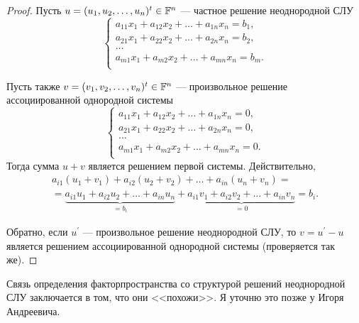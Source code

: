 \begin{proof}
    Пусть $u = (u_1, u_2, \ldots, u_n)^t \in \mathbb{F}^n$ --- частное решение неоднородной СЛУ
    \[
        \begin{cases}
            a_{11}x_1 + a_{12}x_2 + \ldots + a_{1n}x_n = b_1,\\
            a_{21}x_1 + a_{22}x_2 + \ldots + a_{2n}x_n = b_2,\\
            \ldots\\
            a_{m1}x_1 + a_{m2}x_2 + \ldots + a_{mn}x_n = b_m.\\
        \end{cases}
    \]

    Пусть также $v = (v_1, v_2, \ldots, v_n)^t \in \mathbb{F}^n$ --- произвольное решение ассоциированной однородной системы
    \[
        \begin{cases}
            a_{11}x_1 + a_{12}x_2 + \ldots + a_{1n}x_n = 0,\\
            a_{21}x_1 + a_{22}x_2 + \ldots + a_{2n}x_n = 0,\\
            \ldots\\
            a_{m1}x_1 + a_{m2}x_2 + \ldots + a_{mn}x_n = 0.\\
        \end{cases}
    \]
    Тогда сумма $u + v$ является решением первой системы. Действительно,
    \begin{multline*}
        a_{i1}(u_1 + v_1) + a_{i2}(u_2 + v_2) + \ldots + a_{in}(u_n + v_n) =\\ = \underbrace{a_{i1}u_1 + a_{i2}u_2 + \ldots + a_{in}u_n}_{= b_i} + \underbrace{a_{i1}v_1 + a_{i2}v_2 + \ldots + a_{in}v_n}_{= 0} = b_i.
    \end{multline*}

    Обратно, если $u^\prime$ --- произвольное решение неоднородной СЛУ, то $v = u^\prime - u$ является решением ассоциированной однородной системы (проверяется так же).
\end{proof}

Связь определения факторпространства со структурой решений неоднородной СЛУ заключается в том, что они <<похожи>>. Я уточню это позже у Игоря Андреевича.


